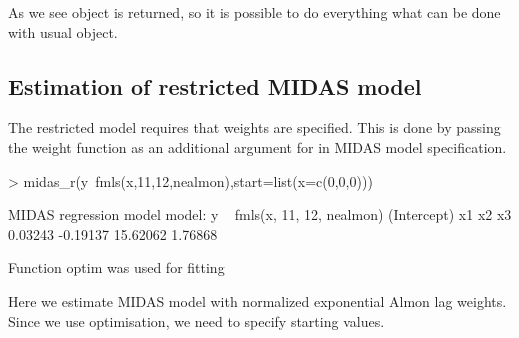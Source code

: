 \documentclass[nojss]{jss}
\begin{document}
As we see  object is returned, so it is possible to do
everything what can be done with usual  object.

\subsection{Estimation of restricted MIDAS model}
The restricted model requires that weights are specified. This is done
by passing the weight function as an additional argument for
 in MIDAS model specification.

\begin{Schunk}
\begin{Sinput}
> midas_r(y~fmls(x,11,12,nealmon),start=list(x=c(0,0,0)))
\end{Sinput}
\begin{Soutput}
MIDAS regression model
 model: y ~ fmls(x, 11, 12, nealmon) 
(Intercept)          x1          x2          x3 
    0.03243    -0.19137    15.62062     1.76868 

Function optim was used for fitting
\end{Soutput}
\end{Schunk}

Here we estimate MIDAS model with normalized exponential Almon lag
weights. Since we use optimisation, we need to specify starting values.



\end{document}
